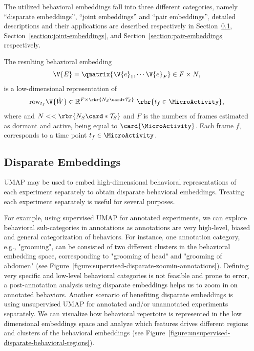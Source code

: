 The utilized behavioral embeddings fall into three different categories, namely ``disparate embeddings'', ``joint embeddings'' and ``pair embeddings'', detailed descriptions and their applications are described respectively in  Section~\ref{section:disparate-embeddings}, Section~\ref{section:joint-embeddings}, and  Section~\ref{section:pair-embeddings} respectively.

The resulting behavioral embedding
\begin{equation}
	\V{E}=\qmatrix{\V{e}_1, \cdots \V{e}_{F}} \in F \times N,
\end{equation}
is a low-dimensional representation of
\begin{equation}
	\mathrm{row}_{t_f} \V{\hat{W}} \in \mathbb{R}^{F \times \rbr{ N_S\card*{\mathcal{T}_S}}} \ \rbr{t_f \in \MicroActivity},
\end{equation}
where and $N << \rbr{ N_S\card*{\mathcal{T}_S}}$ and $F$ is the numbers of frames estimated as dormant and active, being equal to $\card{\MicroActivity}$.
Each frame $f$, corresponds to a time point $t_f\in \MicroActivity$.

\subsection{Disparate Embeddings}\label{section:disparate-embeddings}
UMAP may be used to embed high-dimensional behavioral representations of each experiment separately to obtain disparate behavioral embeddings. Treating each experiment separately is useful for several purposes.

For example, using supervised UMAP for annotated experiments, we can explore behavioral sub-categories in annotations as annotations are very high-level, biased and general categorization of behaviors. For instance, one annotation category, e.g., "grooming", can be consisted of two different clusters in the behavioral embedding space, corresponding to "grooming of head" and "grooming of abdomen" (see Figure~\ref{figure:supervised-disparate-zoomin-annotations}).
Defining very specific and low-level behavioral categories is not feasible and prone to error, a post-annotation analysis using disparate embeddings helps us to zoom in on annotated behaviors.
Another scenario of benefiting disparate embeddings is using unsupervised UMAP for annotated and/or unannotated experiments separately.
We can visualize how behavioral repertoire is represented in the low dimensional embeddings space and analyze which features drives different regions and clusters of the behavioral embeddings (see Figure~\ref{figure:unsupervised-disparate-behavioral-regions}).

